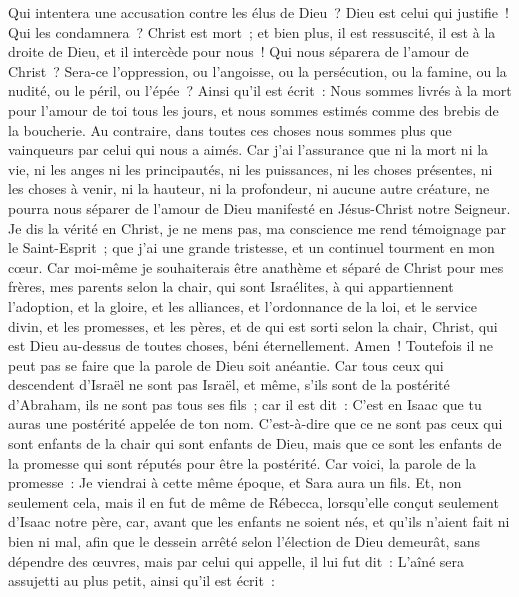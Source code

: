 \begin{multicols}{2}
Qui intentera une accusation contre les élus de Dieu~? Dieu est celui qui justifie~!
Qui les condamnera~? Christ est mort~; et bien plus, il est ressuscité, il est à la droite de Dieu, et il intercède pour nous~!
Qui nous séparera de l'amour de Christ~? Sera-ce l'oppression, ou l'angoisse, ou la persécution, ou la famine, ou la nudité, ou le péril, ou l'épée~?
Ainsi qu'il est écrit~: Nous sommes livrés à la mort pour l'amour de toi tous les jours, et nous sommes estimés comme des brebis de la boucherie.
Au contraire, dans toutes ces choses nous sommes plus que vainqueurs par celui qui nous a aimés.
Car j'ai l'assurance que ni la mort ni la vie, ni les anges ni les principautés, ni les puissances, ni les choses présentes, ni les choses à venir,
ni la hauteur, ni la profondeur, ni aucune autre créature, ne pourra nous séparer de l'amour de Dieu manifesté en Jésus-Christ notre Seigneur.
\VerseOne{}Je dis la vérité en Christ, je ne mens pas, ma conscience me rend témoignage par le Saint-Esprit~;
que j'ai une grande tristesse, et un continuel tourment en mon cœur.
Car moi-même je souhaiterais être anathème et séparé de Christ pour mes frères, mes parents selon la chair,
qui sont Israélites, à qui appartiennent l'adoption, et la gloire, et les alliances, et l'ordonnance de la loi, et le service divin,
et les promesses, et les pères, et de qui est sorti selon la chair, Christ, qui est Dieu au-dessus de toutes choses, béni éternellement. Amen~!
Toutefois il ne peut pas se faire que la parole de Dieu soit anéantie. Car tous ceux qui descendent d'Israël ne sont pas Israël,
et même, s'ils sont de la postérité d'Abraham, ils ne sont pas tous ses fils~; car il est dit~: C'est en Isaac que tu auras une postérité appelée de ton nom.
C'est-à-dire que ce ne sont pas ceux qui sont enfants de la chair qui sont enfants de Dieu, mais que ce sont les enfants de la promesse qui sont réputés pour être la postérité.
Car voici, la parole de la promesse~: Je viendrai à cette même époque, et Sara aura un fils.
Et, non seulement cela, mais il en fut de même de Rébecca, lorsqu'elle conçut seulement d'Isaac notre père,
car, avant que les enfants ne soient nés, et qu'ils n'aient fait ni bien ni mal, afin que le dessein arrêté selon l'élection de Dieu demeurât, sans dépendre des œuvres, mais par celui qui appelle, 
il lui fut dit~: L'aîné sera assujetti au plus petit, ainsi qu'il est écrit~:

\end{multicols}
